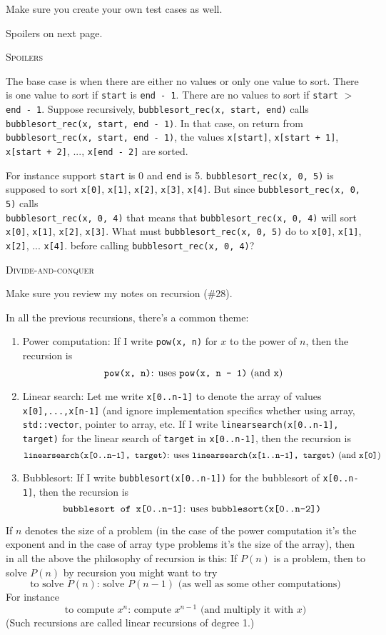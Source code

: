 Make sure you create your own test cases as well.

Spoilers on next page.

\newpage
\textsc{Spoilers}

The base case is when there are either no values or only one value
to sort.
There is one value to sort if \verb!start! is \verb!end - 1!.
There are no values to sort if \verb!start! $>$ \verb!end - 1!.
Suppose recursively, \verb!bubblesort_rec(x, start, end)! calls
\\
\verb!bubblesort_rec(x, start, end - 1)!.
In that case, on return from
\\
\verb!bubblesort_rec(x, start, end - 1)!,
the values
\verb!x[start]!,
\verb!x[start + 1]!,
\verb!x[start + 2]!, ..., 
\verb!x[end - 2]!
are sorted.

For instance support \verb!start! is 0 and \verb!end! is 5.
\verb!bubblesort_rec(x, 0, 5)! is supposed to sort
\verb!x[0]!,
\verb!x[1]!,
\verb!x[2]!, 
\verb!x[3]!, 
\verb!x[4]!.
But since
\verb!bubblesort_rec(x, 0, 5)!
calls
\\
\verb!bubblesort_rec(x, 0, 4)!
that means that
\verb!bubblesort_rec(x, 0, 4)!
will sort
\verb!x[0]!,
\verb!x[1]!,
\verb!x[2]!,
\verb!x[3]!.
What must
\verb!bubblesort_rec(x, 0, 5)! do to 
\verb!x[0]!,
\verb!x[1]!,
\verb!x[2]!, ...
\verb!x[4]!.
before calling
\verb!bubblesort_rec(x, 0, 4)!?

\newpage
\textsc{Divide-and-conquer}

Make sure you review my notes on recursion (\#28).

In all the previous recursions, there's a common theme:
\begin{enumerate}[nosep]
\item Power computation: If I write \texttt{pow(x, n)} for $x$
to the power of $n$,
then the recursion is
\[
\text{\texttt{pow(x, n)}: uses \texttt{pow(x, n - 1)} (and \texttt{x})}
\]
\item Linear search: Let me write \texttt{x[0..n-1]}
to denote the array
of values \texttt{x[0],...,x[n-1]}
(and ignore implementation specifics
whether using array, \verb!std::vector!, pointer to array, etc.
If I write \verb!linearsearch(x[0..n-1], target)! for the
linear search of \verb!target!
in \verb!x[0..n-1]!, then the recursion is
{\small
\[
\text{\texttt{linearsearch(x[0..n-1], target)}: uses
\texttt{linearsearch(x[1..n-1], target)} (and \texttt{x[0]})}
\]
}
\item Bubblesort:  
If I write \verb!bubblesort(x[0..n-1])! for the bubblesort of
\verb!x[0..n-1]!, then the recursion is
\[
\text{\texttt{bubblesort of x[0..n-1]}: uses
\texttt{bubblesort(x[0..n-2])}
}
\]
\end{enumerate}
If $n$ denotes the size of a problem (in the case of the power computation
it's the exponent and in the case of array type problems it's the size of the
array), then in all the above the philosophy of recursion is this:
If $P(n)$ is a problem, then to solve $P(n)$ by recursion you might want to try
\[
\text{to solve $P(n)$: solve $P(n-1)$ (as well as some other computations)}
\]
For instance
\[
\text{to compute $x^n$: compute $x^{n-1}$ (and multiply it with $x$)}
\]
(Such recursions are called linear recursions of degree 1.)

